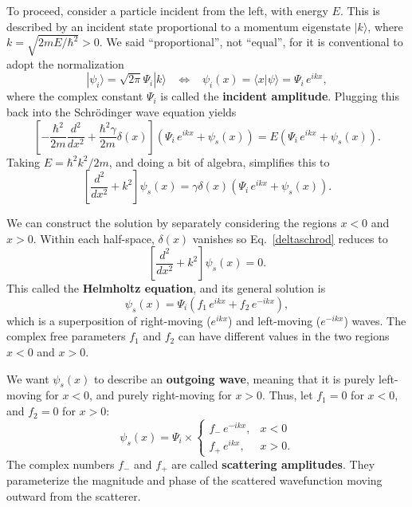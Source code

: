\documentclass[pra,12pt]{revtex4}
\begin{document}
To proceed, consider a particle incident from the left, with energy
$E$.  This is described by an incident state proportional to a
momentum eigenstate $|k\rangle$, where $k = \sqrt{2mE/\hbar^2} > 0$.
We said ``proportional'', not ``equal'', for it is conventional to
adopt the normalization
\begin{equation}
  |\psi_i\rangle = \sqrt{2\pi}\Psi_i |k\rangle \;\;\; \Leftrightarrow\;\;\; \psi_i(x) = \langle x|\psi\rangle = \Psi_i \, e^{ik x},
\end{equation}
where the complex constant $\Psi_i$ is called the \textbf{incident
  amplitude}.  Plugging this back into the Schr\"odinger wave equation
yields
\begin{equation}
  \left[-\frac{\hbar^2}{2m} \frac{d^2}{dx^2} + \frac{\hbar^2\gamma}{2m}\delta(x)\right] \left(\Psi_i \, e^{ikx} + \psi_s(x) \right) = E \left(\Psi_i \, e^{ikx} + \psi_s(x) \right).
\end{equation}
Taking $E = \hbar^2k^2/2m$, and doing a bit of algebra, simplifies this to
\begin{equation}
  \left[ \frac{d^2}{dx^2} + k^2\right] \psi_s(x) =  \gamma \delta(x) \left(\Psi_i \, e^{ikx} + \psi_s(x) \right).
  \label{deltaschrod}
\end{equation}

We can construct the solution by separately considering the regions $x
< 0$ and $x > 0$.  Within each half-space, $\delta(x)$ vanishes so
Eq.~\eqref{deltaschrod} reduces to
\begin{equation}
  \left[\frac{d^2}{dx^2} + k^2\right] \psi_s(x) = 0.
\end{equation}
This called the \textbf{Helmholtz equation}, and its general solution
is
\begin{equation}
  \psi_s(x) = \Psi_i \left(f_1 \, e^{ik x} + f_2 \, e^{-ik x}\right),
\end{equation}
which is a superposition of right-moving ($e^{ikx}$) and left-moving
($e^{-ikx}$) waves.  The complex free parameters $f_1$ and $f_2$ can
have different values in the two regions $x < 0$ and $x > 0$.

We want $\psi_s(x)$ to describe an \textbf{outgoing wave}, meaning
that it is purely left-moving for $x < 0$, and purely right-moving for
$x > 0$.  Thus, let $f_1 = 0$ for $x < 0$, and $f_2 = 0$ for $x > 0$:
\begin{equation}
  \psi_s(x) = \Psi_i \times \begin{cases}f_- \,e^{-ikx}, & x < 0 \\ f_+ \,e^{ikx}, & x > 0.\end{cases}
\end{equation}
The complex numbers $f_-$ and $f_+$ are called \textbf{scattering
  amplitudes}.  They parameterize the magnitude and phase of the
scattered wavefunction moving outward from the scatterer.
\end{document}
